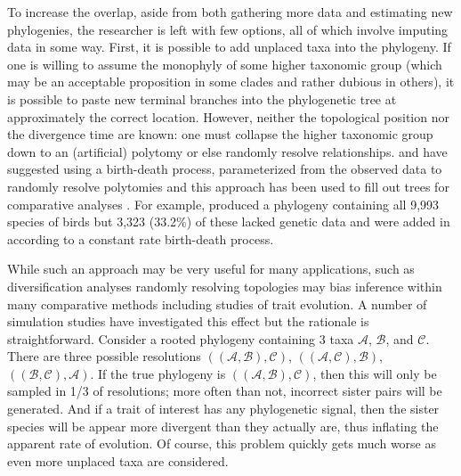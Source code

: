 \documentclass[a4paper,11pt]{article}
\begin{document}
To increase the overlap, aside from both gathering more data and estimating new phylogenies, the researcher is left with few options, all of which involve imputing data in some way. First, it is possible to add unplaced taxa into the phylogeny. If one is willing to assume the monophyly of some higher taxonomic group (which may be an acceptable proposition in some clades and rather dubious in others), it is possible to paste new terminal branches into the phylogenetic tree at approximately the correct location. However, neither the topological position nor the divergence time are known: one must collapse the higher taxonomic group down to an (artificial) polytomy or else randomly resolve relationships. \citet{Kuhn2011} and \citet{ThomasPastis} have suggested using a birth-death process, parameterized from the observed data to randomly resolve polytomies \citep[see also][for a related approach for fossil trees]{Bapst2013} and this approach has been used to fill out trees for comparative analyses \citep{Jetz2012, Price2012, Rolland2014, Jetz2014}. For example, \citet{Jetz2012} produced a phylogeny containing all 9,993 species of birds but 3,323 (33.2\%) of these lacked genetic data and were added in according to a constant rate birth-death process. 

While such an approach may be very useful for many applications, such as diversification analyses \citep{Kuhn2011, Rabosky2015} randomly resolving topologies may bias inference within many comparative methods including studies of trait evolution. A number of simulation studies have investigated this effect \citep{Losos1994, Martins1996, Davies2012, Bapst2014, Rabosky2015} but the rationale is straightforward. Consider a rooted phylogeny containing 3 taxa $\mathcal{A}$, $\mathcal{B}$, and $\mathcal{C}$. There are three possible resolutions $((\mathcal{A},\mathcal{B}),\mathcal{C})$, $((\mathcal{A},\mathcal{C}),\mathcal{B})$, $((\mathcal{B},\mathcal{C}),\mathcal{A})$. If the true phylogeny is $((\mathcal{A},\mathcal{B}),\mathcal{C})$, then this will only be sampled in 1/3 of resolutions; more often than not, incorrect sister pairs will be generated. And if a trait of interest has any phylogenetic signal, then the sister species will be appear more divergent than they actually are, thus inflating the apparent rate of evolution. Of course, this problem quickly gets much worse as even more unplaced taxa are considered.
\end{document}
